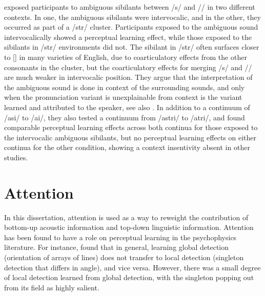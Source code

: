 \citet{Kraljic2008a} exposed participants to ambiguous sibilants between /s/ and /\textesh/ in two different contexts.  
In one, the ambiguous sibilants were intervocalic, and in the other, they occurred as part of a /str/ cluster.  
Participants exposed to the ambiguous sound intervocalically showed a perceptual learning effect, while those exposed to the sibilants in /str/ environments did not.  
The sibilant in /str/ often surfaces closer to [\textesh] in many varieties of English, due to coarticulatory effects from the other consonants in the cluster, but the coarticulatory effects for merging /s/ and /\textesh/ are much weaker in intervocalic position.  
They argue that the interpretation of the ambiguous sound is done in context of the surrounding sounds, and only when the pronunciation variant is unexplainable from context is the variant learned and attributed to the speaker, see also \citet{Kraljic2008}.  
In addition to a continuum of /asi/ to /a\textesh i/, they also tested a continuum from /astri/ to /a\textesh tri/, and found comparable perceptual learning effects across both continua for those exposed to the intervocalic ambiguous sibilants, but no perceptual learning effects on either continua for the other condition, showing a context insentivity absent in other studies.

\section{Attention}

In this dissertation, attention is used as a way to reweight the contribution of bottom-up acoustic information and top-down linguistic information.
Attention has been found to have a role on perceptual learning in the psychophysics literature.  
For instance, \citet{Ahissar1993} found that in general, learning global detection (orientation of arrays of lines) does not transfer to local detection (singleton detection that differs in angle), and vice versa.  However, there was a small degree of local detection learned from global detection, with the singleton popping out from its field as highly salient.


